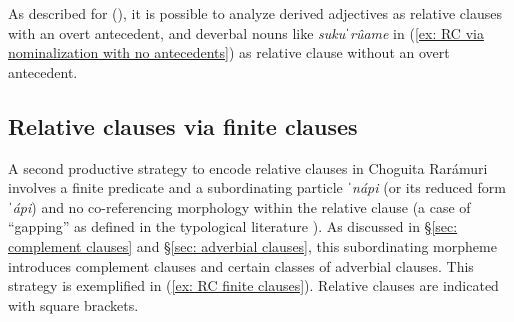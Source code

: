     \z
\z

As described for  (\citealt[180]{miller1996guarijio}), it is possible to analyze derived adjectives as relative clauses with an overt antecedent, and deverbal nouns like \textit{sukuˈrûame} in (\ref{ex: RC via nominalization with no antecedents}) as relative clause without an overt antecedent.

\subsection{Relative clauses via finite clauses}
\label{subsec: RC finite clauses}

A second productive strategy to encode relative clauses in Choguita Rarámuri involves a finite predicate and a subordinating particle \textit{ˈnápi} (or its reduced form \textit{ˈápi}) and no co-referencing morphology within the relative clause (a case of ``gapping'' as defined in the typological literature \citealt{lehmann1986typology}). As discussed in §\ref{sec: complement clauses} and §\ref{sec: adverbial clauses}, this subordinating morpheme introduces complement clauses and certain classes of adverbial clauses. This strategy is exemplified in (\ref{ex: RC finite clauses}). Relative clauses are indicated with square brackets.


